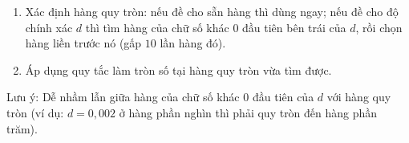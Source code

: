 \begin{enumerate}
\item Xác định hàng quy tròn: nếu đề cho sẵn hàng thì dùng ngay; nếu đề cho độ chính xác $d$ thì tìm hàng của chữ số khác $0$ đầu tiên bên trái của $d$, rồi chọn hàng liền trước nó (gấp $10$ lần hàng đó).
\item Áp dụng quy tắc làm tròn số tại hàng quy tròn vừa tìm được.
\end{enumerate}
Lưu ý: Dễ nhầm lẫn giữa hàng của chữ số khác $0$ đầu tiên của $d$ với hàng quy tròn (ví dụ: $d = 0{,}002$ ở hàng phần nghìn thì phải quy tròn đến hàng phần trăm).
